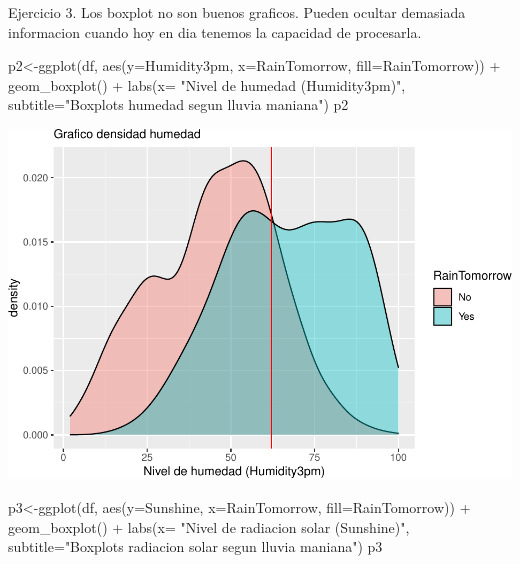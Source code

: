 \documentclass[
]{article}
\newenvironment{Shaded}{\begin{snugshade}}{\end{snugshade}}
\newcommand{\AttributeTok}[1]{\textcolor[rgb]{0.77,0.63,0.00}{#1}}
\newcommand{\FunctionTok}[1]{\textcolor[rgb]{0.00,0.00,0.00}{#1}}
\newcommand{\NormalTok}[1]{#1}
\newcommand{\OtherTok}[1]{\textcolor[rgb]{0.56,0.35,0.01}{#1}}
\newcommand{\SpecialCharTok}[1]{\textcolor[rgb]{0.00,0.00,0.00}{#1}}
\newcommand{\StringTok}[1]{\textcolor[rgb]{0.31,0.60,0.02}{#1}}
\begin{document}
Ejercicio 3. Los boxplot no son buenos graficos. Pueden ocultar
demasiada informacion cuando hoy en dia tenemos la capacidad de
procesarla.

\begin{Shaded}
\begin{Highlighting}[]
\NormalTok{p2}\OtherTok{\textless{}{-}}\FunctionTok{ggplot}\NormalTok{(df, }\FunctionTok{aes}\NormalTok{(}\AttributeTok{y=}\NormalTok{Humidity3pm, }\AttributeTok{x=}\NormalTok{RainTomorrow, }\AttributeTok{fill=}\NormalTok{RainTomorrow)) }\SpecialCharTok{+}
  \FunctionTok{geom\_boxplot}\NormalTok{() }\SpecialCharTok{+} \FunctionTok{labs}\NormalTok{(}\AttributeTok{x=} \StringTok{"Nivel de humedad (Humidity3pm)"}\NormalTok{,}
       \AttributeTok{subtitle=}\StringTok{"Boxplots humedad segun lluvia maniana"}\NormalTok{)}
\NormalTok{p2}
\end{Highlighting}
\end{Shaded}

\includegraphics{tpEstadistica_files/figure-latex/unnamed-chunk-12-1.pdf}

\begin{Shaded}
\begin{Highlighting}[]
\NormalTok{p3}\OtherTok{\textless{}{-}}\FunctionTok{ggplot}\NormalTok{(df, }\FunctionTok{aes}\NormalTok{(}\AttributeTok{y=}\NormalTok{Sunshine, }\AttributeTok{x=}\NormalTok{RainTomorrow, }\AttributeTok{fill=}\NormalTok{RainTomorrow)) }\SpecialCharTok{+}
  \FunctionTok{geom\_boxplot}\NormalTok{() }\SpecialCharTok{+} \FunctionTok{labs}\NormalTok{(}\AttributeTok{x=} \StringTok{"Nivel de radiacion solar (Sunshine)"}\NormalTok{,}
       \AttributeTok{subtitle=}\StringTok{"Boxplots radiacion solar segun lluvia maniana"}\NormalTok{)}
\NormalTok{p3}
\end{Highlighting}
\end{Shaded}
\end{document}
